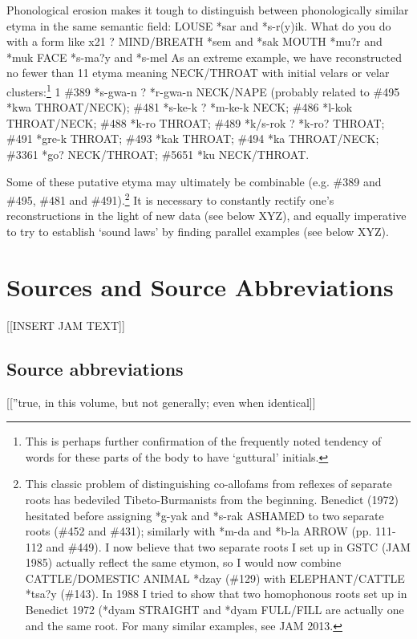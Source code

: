 Phonological erosion makes it tough to distinguish between phonologically similar etyma in the same semantic field:
		LOUSE *sar and *s-r(y)ik. What do you do with a form like x21 ?
		MIND/BREATH *sem and *sak
		MOUTH *mu?r and *muk
		FACE *s-ma?y and *s-mel
As an extreme example, we have reconstructed no fewer than 11 etyma meaning NECK/THROAT with initial velars or velar clusters:\footnote{This is perhaps further confirmation of the frequently noted tendency of words for these parts of the body to have ‘guttural’ initials.} 1 \#389 *s-gwa-n ? *r-gwa-n NECK/NAPE (probably related to \#495 *kwa THROAT/NECK); \#481 *s-ke-k ? *m-ke-k NECK; \#486 *l-kok THROAT/NECK; \#488 *k-ro THROAT; \#489 *k/s-rok ? *k-ro? THROAT; \#491 *gre-k THROAT; \#493 *kak THROAT; \#494 *ka THROAT/NECK; \#3361 *go? NECK/THROAT; \#5651 *ku NECK/THROAT.

Some of these putative etyma may ultimately be combinable (e.g. \#389 and \#495, \#481 and \#491).\footnote{ This classic problem of distinguishing co-allofams from reflexes of separate roots has bedeviled Tibeto-Burmanists from the beginning. Benedict (1972) hesitated before assigning *g-yak and *s-rak ASHAMED to two separate roots (\#452 and \#431); similarly with *m-da and *b-la ARROW (pp. 111-112 and \#449). I now believe that two separate roots I set up in GSTC (JAM 1985) actually reflect the same etymon, so I would now combine CATTLE/DOMESTIC ANIMAL *dzay (\#129) with ELEPHANT/CATTLE *tsa?y (\#143). In 1988 I tried to show that two homophonous roots set up in Benedict 1972 (*dyam STRAIGHT and *dyam FULL/FILL are actually one and the same root. For many similar examples, see JAM 2013.} It is necessary to constantly rectify one’s reconstructions in the light of new data (see below XYZ), and equally imperative to try to establish ‘sound laws’ by finding parallel examples (see below XYZ).
	
	
	
\section{Sources and Source Abbreviations}

[[INSERT JAM TEXT]]

\subsection{Source abbreviations}

[[”true, in this volume, but not generally; even when identical]]


